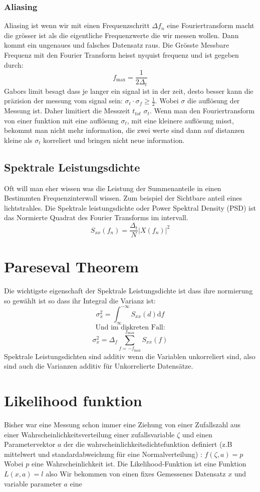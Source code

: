 \documentclass{article}
\begin{document}
\subsubsection*{Aliasing} Aliasing ist wenn wir mit einen Frequenzschritt $\Delta f_n$ eine Fouriertransform macht die grösser ist als die eigentliche Frequenzwerte die wir messen wollen. Dann kommt ein ungenaues und falsches Datensatz raus. Die Grösste Messbare Frequenz mit den Fourier Transform heisst nyquist frequenz und ist gegeben durch:
\[f_{\text{max}}=\frac{1}{2\Delta_t}\]
Gabors limit besagt dass je langer ein signal ist in der zeit, desto besser kann die präzision der messung vom signal sein: $\sigma_t\cdot\sigma_f\ge\frac{1}{2}$. Wobei $\sigma$ die auflösung der Messung ist.
Daher limitiert die Messzeit $t_{tot}$ $\sigma_t$. Wenn man den Fouriertransform von einer funktion mit eine auflösung $\sigma_t$, mit eine kleinere auflösung misst, bekommt man nicht mehr information, die zwei werte sind dann auf distanzen kleine als $\sigma_t$ korreliert und bringen nicht neue information.
\hypertarget{psd}{\subsection*{Spektrale Leistungsdichte}}
Oft will man eher wissen was die Leistung der Summenanteile in einen Bestimmten Frequenzinterwall wissen. Zum beispiel der Sichtbare anteil eines lichtstrahles. Die Spektrale leistungsdichte oder Power Spektral Density (PSD) ist das Normierte Quadrat des Fourier Transforms im intervall.
\[S_{xx}(f_n)=\frac{\Delta_t}{N}|X(f_n)|^2\]
\hypertarget{parseval}{\section*{Pareseval Theorem}}
Die wichtigste eigenschaft der Spektrale Leistungsdichte ist dass ihre normierung so gewählt ist so dass ihr Integral die Varianz ist:
\[\sigma_x^2=\int^{-\infty}_{\infty}S_{xx}(d)\text{d}f\]
\[\text{Und im diskreten Fall:}\]
\[\sigma_x^2=\Delta_f\sum_{f=-f_{\text{max}}}^{f_{\text{max}}}S_{xx}(f)\]
Spektrale Leistungsdichten sind additiv wenn die Variablen unkorreliert sind, also sind auch die Varianzen additiv für Unkorrelierte Datensätze.
\hypertarget{likelihood}{\section*{Likelihood funktion}}
Bisher war eine Messung schon immer eine Ziehung von einer Zufallszahl aus einer Wahrscheinlichkeitsverteilung einer zufallsvariable $\zeta$ und einen Parametervektor $a$ der die wahrscheinlichkeitsdichtefunktion definiert (z.B mittelwert und standardabweichung für eine Normalverteilung) : $f(\zeta, a)=p$ Wobei $p$ eine Wahrscheinlichkeit ist. Die Likelihood-Funktion ist eine Funktion $L(x,a)=l$ also Wir bekommen von einen fixes Gemessenes Datensatz $x$ und variable parameter $a$ eine
\end{document}
